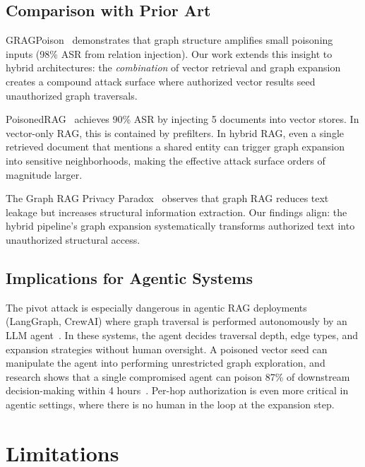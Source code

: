 \documentclass[letterpaper,twocolumn,10pt]{article}
\begin{document}
\subsection{Comparison with Prior Art}

GRAGPoison~\cite{gragpoison2026} demonstrates that graph structure
amplifies small poisoning inputs (98\% ASR from relation injection).
Our work extends this insight to hybrid architectures: the
\emph{combination} of vector retrieval and graph expansion creates a
compound attack surface where authorized vector results seed
unauthorized graph traversals.

PoisonedRAG~\cite{zou2025poisonedrag} achieves 90\% ASR by injecting
5 documents into vector stores. In vector-only RAG, this is
contained by prefilters. In hybrid RAG, even a single retrieved
document that mentions a shared entity can trigger graph expansion
into sensitive neighborhoods, making the effective attack surface
orders of magnitude larger.

The Graph RAG Privacy Paradox~\cite{graphragprivacy2025} observes
that graph RAG reduces text leakage but increases structural
information extraction. Our findings align: the hybrid pipeline's
graph expansion systematically transforms authorized text into
unauthorized structural access.

\subsection{Implications for Agentic Systems}

The pivot attack is especially dangerous in agentic RAG deployments
(LangGraph, CrewAI) where graph traversal is performed autonomously
by an LLM agent~\cite{multiagentic2025}. In these systems, the
agent decides traversal depth, edge types, and expansion strategies
without human oversight. A poisoned vector seed can manipulate the
agent into performing unrestricted graph exploration, and research
shows that a single compromised agent can poison 87\% of downstream
decision-making within 4 hours~\cite{multiagentic2025}. Per-hop
authorization is even more critical in agentic settings, where there
is no human in the loop at the expansion step.

\section{Limitations}
\label{sec:limitations}
\end{document}
